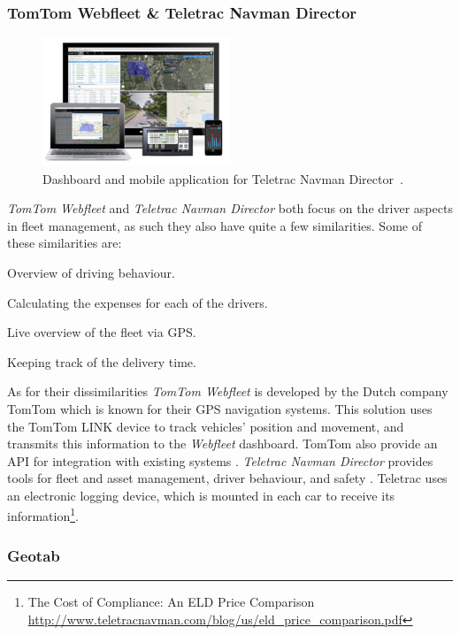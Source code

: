 \subsubsection{TomTom Webfleet \& Teletrac Navman Director}
\begin{figure}[h!]
    \centering
    \includegraphics[width=0.5\textwidth]{img/TELETRAC.jpg}
    \caption{Dashboard and mobile application for Teletrac Navman Director~\cite{teletrac}.}
    \label{fig:TELETRAC_NAVMAN_DIRECTOR}
\end{figure}
\textit{TomTom Webfleet} and \textit{Teletrac Navman Director} both focus on the driver aspects in fleet management, as such they also have quite a few similarities.
Some of these similarities are:
\begin{description}
    \item Overview of driving behaviour.
    \item Calculating the expenses for each of the drivers.
    \item Live overview of the fleet via GPS.
    \item Keeping track of the delivery time.
\end{description}
As for their dissimilarities \textit{TomTom Webfleet} is developed by the Dutch company TomTom which is known for their GPS navigation systems. This solution uses the TomTom LINK device to track vehicles' position and movement, and transmits this information to the \textit{Webfleet} dashboard. TomTom also provide an API for integration with existing systems \cite{tomtom}.
\textit{Teletrac Navman Director} provides tools for fleet and asset management, driver behaviour, and safety \cite{teletracnavman}.
Teletrac uses an electronic logging device, which is mounted in each car to receive its information\footnote{The Cost of Compliance: An ELD Price Comparison \url{http://www.teletracnavman.com/blog/us/eld_price_comparison.pdf}}.
\subsubsection{Geotab}

